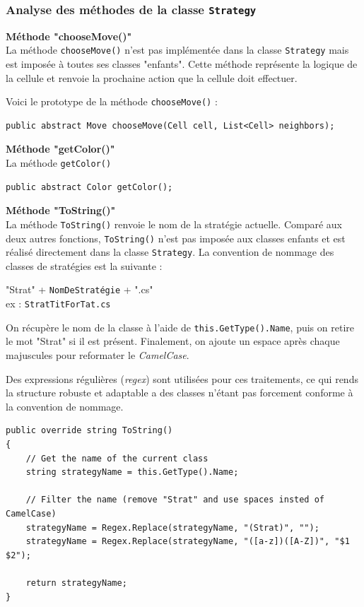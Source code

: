 \documentclass[a4paper]{article}
\begin{document}
\subsubsection{Analyse des méthodes de la classe \texttt{Strategy}}
\textbf{Méthode "chooseMove()"}\\
La méthode \texttt{chooseMove()} n'est pas implémentée dans la classe \texttt{Strategy} mais est imposée à toutes ses classes "enfants". Cette méthode représente la logique de la cellule et renvoie la prochaine action que la cellule doit effectuer.

Voici le prototype de la méthode \texttt{chooseMove()} :
\begin{lstlisting}
public abstract Move chooseMove(Cell cell, List<Cell> neighbors);
\end{lstlisting}

\textbf{Méthode "getColor()"}\\
La méthode \texttt{getColor()} 

\begin{lstlisting}
public abstract Color getColor();
\end{lstlisting}

\textbf{Méthode "ToString()"}\\
La méthode \texttt{ToString()} renvoie le nom de la stratégie actuelle. Comparé aux deux autres fonctions, \texttt{ToString()} n'est pas imposée aux classes enfants et est réalisé directement dans la classe \texttt{Strategy}. La convention de nommage des classes de stratégies est la suivante : 

\begin{framed}
\centering
"Strat" + \texttt{NomDeStratégie} + ".cs"\\
ex : \texttt{StratTitForTat.cs}
\end{framed}

On récupère le nom de la classe à l'aide de \texttt{this.GetType().Name}, puis on retire le mot "Strat" si il est présent. Finalement, on ajoute un espace après chaque majuscules pour reformater le \textit{CamelCase}.

Des expressions régulières (\textit{regex}) sont utilisées pour ces traitements, ce qui rends la structure robuste et adaptable a des classes n'étant pas forcement conforme à la convention de nommage.

\begin{lstlisting}
public override string ToString()
{
    // Get the name of the current class
    string strategyName = this.GetType().Name;

    // Filter the name (remove "Strat" and use spaces insted of CamelCase)
    strategyName = Regex.Replace(strategyName, "(Strat)", "");
    strategyName = Regex.Replace(strategyName, "([a-z])([A-Z])", "$1 $2");

    return strategyName;
}
\end{lstlisting}
\pagebreak
\end{document}
